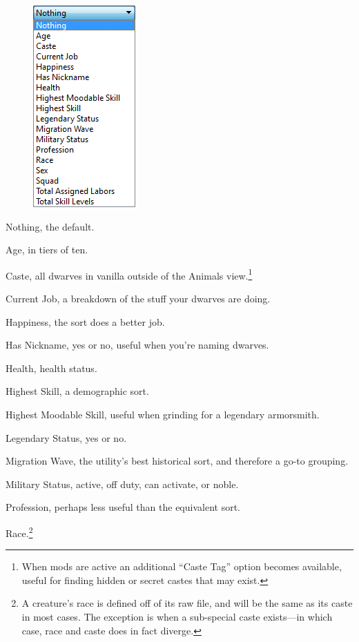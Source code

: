 \documentclass[]{article}
\begin{document}
\begin{figure}
\begin{center}
\includegraphics[scale=.75]{Sec1Fig11+.png}
\vspace{-20pt}
\end{center}
\end{figure}
\noindent Nothing, the default.

\noindent Age, in tiers of ten.

\noindent Caste, all dwarves in vanilla outside of the Animals view.\footnote{When mods are active an
additional ``Caste Tag'' option becomes available, useful for finding hidden or secret castes that may
exist.}

\noindent Current Job, a breakdown of the stuff your dwarves are doing.

\noindent Happiness, the sort does a better job.

\noindent Has Nickname, yes or no, useful when you're naming dwarves.

\noindent Health, health status.

\noindent Highest Skill, a demographic sort.

\noindent Highest Moodable Skill, useful when grinding for a legendary armorsmith.

\noindent Legendary Status, yes or no.

\noindent Migration Wave, the utility's best historical sort, and therefore
a go-to grouping.

\noindent Military Status, active, off duty, can activate, or noble.

\noindent Profession, perhaps less useful than the equivalent sort.

\noindent Race.\footnote{A creature's race is
defined off of its raw file, and will be the same as its caste in most cases. The exception is when a
sub-special caste exists---in which case, race and caste does in fact diverge.}
\end{document}
